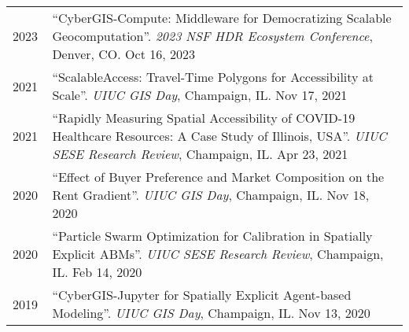 \documentclass{acmcv}
\begin{document}
    \begin{longtable}{p{0.1\linewidth} p{0.9\linewidth}}
        2023 & ``CyberGIS-Compute: Middleware for Democratizing Scalable Geocomputation''. \textit{2023 NSF HDR Ecosystem Conference}, Denver, CO. Oct 16, 2023 \\

        2021 & ``ScalableAccess: Travel-Time Polygons for Accessibility at Scale''. \textit{UIUC GIS Day}, Champaign, IL. Nov 17, 2021 \\

        2021 & ``Rapidly Measuring Spatial Accessibility of COVID-19 Healthcare Resources: A Case Study of Illinois, USA''. \textit{UIUC SESE Research Review}, Champaign, IL. Apr 23, 2021 \\ 

        2020 & ``Effect of Buyer Preference and Market Composition on the Rent Gradient''. \textit{UIUC GIS Day}, Champaign, IL. Nov 18, 2020 \\

        2020 & ``Particle Swarm Optimization for Calibration in Spatially Explicit ABMs''. \textit{UIUC SESE Research Review}, Champaign, IL. Feb 14, 2020 \\ 

        2019 & ``CyberGIS-Jupyter for Spatially Explicit Agent-based Modeling''. \textit{UIUC GIS Day}, Champaign, IL. Nov 13, 2020 \\

    \end{longtable}




\end{document}
